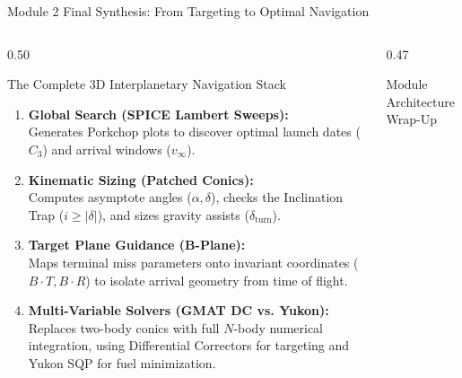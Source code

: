 \documentclass[aspectratio=169, 10pt]{beamer}
\begin{document}
\begin{frame}{Module 2 Final Synthesis: From Targeting to Optimal Navigation}
    \begin{columns}[t]
        \begin{column}{0.50\textwidth}
            \begin{block}{The Complete 3D Interplanetary Navigation Stack}
                \scriptsize
                \begin{enumerate}\setlength{\itemsep}{2.5pt}\setlength{\topsep}{1pt}
                    \item \textbf{Global Search (SPICE Lambert Sweeps):} \\
                    Generates Porkchop plots to discover optimal launch dates ($C_3$) and arrival windows ($v_\infty$).
                    \item \textbf{Kinematic Sizing (Patched Conics):} \\
                    Computes asymptote angles ($\alpha, \delta$), checks the Inclination Trap ($i \ge \vert{}\delta\vert{}$), and sizes gravity assists ($\delta_{\text{turn}}$).
                    \item \textbf{Target Plane Guidance (B-Plane):} \\
                    Maps terminal miss parameters onto invariant coordinates ($B\cdot T, B\cdot R$) to isolate arrival geometry from time of flight.
                    \item \textbf{Multi-Variable Solvers (GMAT DC vs. Yukon):} \\
                    Replaces two-body conics with full $N$-body numerical integration, using Differential Correctors for targeting and Yukon SQP for fuel minimization.
                \end{enumerate}
            \end{block}
        \end{column}

        \begin{column}{0.47\textwidth}
            \begin{block}{Module Architecture Wrap-Up}
                \centering
                \vspace{0.1cm}
\end{block}
\end{column}
\end{columns}
\end{frame}
\end{document}
